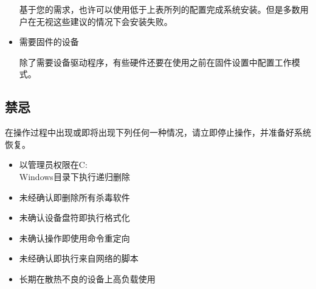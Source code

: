 \documentclass{article}
\begin{document}
\begin{multicols*}{3}
\begin{itemize}[leftmargin=*]
		基于您的需求，也许可以使用低于上表所列的配置完成系统安装。但是多数用户在无视这些建议的情况下会安装失败。

		\item 需要固件的设备

		除了需要设备驱动程序，有些硬件还要在使用之前在固件设置中配置工作模式。

	\end{itemize}


	\begin{tcolorbox}
	\section*{禁忌}
	\end{tcolorbox}

	在操作过程中出现或即将出现下列任何一种情况，请立即停止操作，并准备好系统恢复。

	\begin{itemize}[leftmargin=*]
		\setlength{\itemsep}{0pt}
		\setlength{\parskip}{0pt}
		\setlength{\parsep}{0pt}

		\item 以管理员权限在C:\\Windows目录下执行递归删除
		\item 未经确认即删除所有杀毒软件
		\item 未确认设备盘符即执行格式化
		\item 未确认操作即使用命令重定向
		\item 未经确认即执行来自网络的脚本
		\item 长期在散热不良的设备上高负载使用
	\end{itemize}







\end{multicols*}
\end{document}
